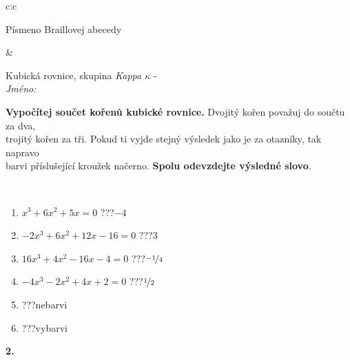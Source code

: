 \documentclass[10pt]{report}
\begin{document}
\begin{tabular}{c:c}
\begin{minipage}[c][104.5mm][t]{0.5\linewidth}
\begin{center}
\begin{minipage}{0.20\linewidth}
\begin{center}
{\small Písmeno Braillovej abecedy}
\end{center}
\end{minipage}
\end{center}
\end{minipage}
&
\begin{minipage}[c][104.5mm][t]{0.5\linewidth}
\begin{center}
\vspace{7mm}
{\huge Kubická rovnice, skupina \textit{Kappa $\kappa$} -}\\[5mm]
\textit{Jméno:}\phantom{xxxxxxxxxxxxxxxxxxxxxxxxxxxxxxxxxxxxxxxxxxxxxxxxxxxxxxxxxxxxxxxxx}\\[5mm]
\begin{minipage}{0.95\linewidth}
\begin{center}
\textbf{Vypočítej součet kořenů kubické rovnice.} Dvojitý kořen považuj do součtu za dva,\\trojitý kořen za tři. Pokud ti vyjde stejný výsledek jako je za otazníky, tak napravo\\barvi příslušející kroužek načerno. \textbf{Spolu odevzdejte výsledné slovo}.
\end{center}
\end{minipage}
\\[1mm]
\begin{minipage}{0.79\linewidth}
\begin{center}
\begin{varwidth}{\linewidth}
\begin{enumerate}
\Large
\item $x^3+6x^2+5x=0$\quad \dotfill\; ???\;\dotfill \quad $-4$
\item $-2x^3+6x^2+12x-16=0$\quad \dotfill\; ???\;\dotfill \quad $3$
\item $16x^3+4x^2-16x-4=0$\quad \dotfill\; ???\;\dotfill \quad $\nicefrac{-1}{4}$
\item $-4x^3-2x^2+4x+2=0$\quad \dotfill\; ???\;\dotfill \quad $\nicefrac{1}{2}$
\item \quad \dotfill\; ???\;\dotfill \quad nebarvi
\item \quad \dotfill\; ???\;\dotfill \quad vybarvi
\end{enumerate}
\end{varwidth}
\end{center}
\end{minipage}
\begin{minipage}{0.20\linewidth}
\begin{center}
{\Huge\bfseries 2.} \\[2mm]

\end{center}
\end{minipage}
\end{center}
\end{minipage}
\end{tabular}
\end{document}
